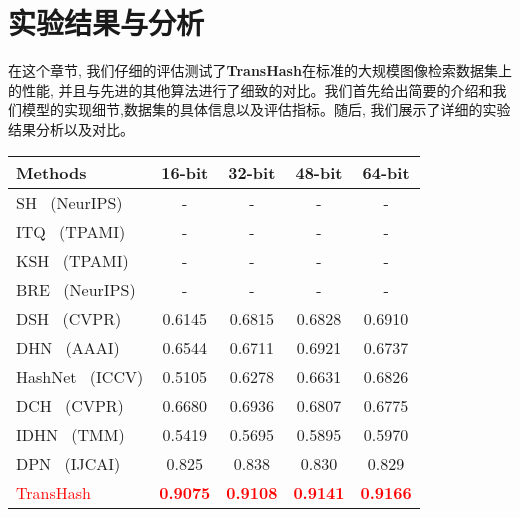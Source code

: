 \section{实验结果与分析}
在这个章节, 我们仔细的评估测试了\textbf{TransHash}在标准的大规模图像检索数据集上的性能, 并且与先进的其他算法进行了细致的对比。我们首先给出简要的介绍和我们模型的实现细节,数据集的具体信息以及评估指标。随后, 我们展示了详细的实验结果分析以及对比。
\begin{table}[!htpb]
    \centering
    \begin{tabular}{cccccc}
       \\ \hline
    \multicolumn{2}{l|}{Methods} & 16-bit & 32-bit & 48-bit & 64-bit   \\\hline
    \multicolumn{2}{l|}{SH~\cite{weiss2008spectral} (NeurIPS)} & - & - & - & -  \\  
    \multicolumn{2}{l|}{ITQ~\cite{gong2012iterative} (TPAMI)} & - & - & - & -  \\  
    \multicolumn{2}{l|}{KSH~\cite{liu2012supervised} (TPAMI)} & - & - & - & -  \\  
    \multicolumn{2}{l|}{BRE~\cite{kulis2009learning} (NeurIPS)} & - & - & - & -  \\  
    \hline
    \hline
    \multicolumn{2}{l|}{DSH~\cite{liu2016deep} (CVPR)} & 0.6145 & 0.6815 & 0.6828 & 0.6910  \\
    \multicolumn{2}{l|}{DHN~\cite{zhu2016deep} (AAAI)} & 0.6544 & 0.6711 & 0.6921 & 0.6737  \\
    \multicolumn{2}{l|}{HashNet~\cite{cao2017hashnet} (ICCV)} & 0.5105 & 0.6278 & 0.6631 & 0.6826  \\
    \multicolumn{2}{l|}{DCH~\cite{cao2018deep} (CVPR)} & 0.6680 & 0.6936 & 0.6807 & 0.6775  \\
    \multicolumn{2}{l|}{IDHN~\cite{cao2018deep} (TMM)} & 0.5419 & 0.5695 & 0.5895 & 0.5970  \\
    \multicolumn{2}{l|}{DPN~\cite{fan2020deep} (IJCAI)} & 0.825 & 0.838 & 0.830 & 0.829  \\
    \hline
    \hline
     \multicolumn{2}{l|}{\textcolor{red}{TransHash} }&\textcolor{red}{\textbf{0.9075}} & \textcolor{red}{\textbf{0.9108}} & \textcolor{red}{\textbf{0.9141}} & \textcolor{red}{\textbf{0.9166}} \\
     \hline
     \hline
    \end{tabular}
    \label{table:cifar}
  \end{table}

